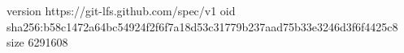 version https://git-lfs.github.com/spec/v1
oid sha256:b58c1472a64bc54924f2f6f7a18d53c31779b237aad75b33e3246d3f6f4425c8
size 6291608
